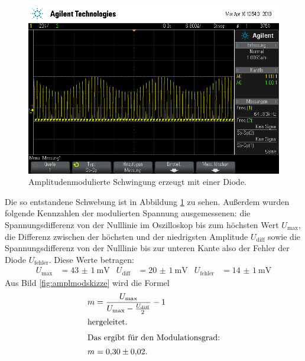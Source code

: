 \begin{figure}[h]
  \centering
  \includegraphics[width=.9\textwidth]{Oszi_Pics/amplModDiode.png}
  \caption{Amplitudenmodulierte Schwingung erzeugt mit einer Diode.}
  \label{fig:amplModDiode}
\end{figure}

Die so entstandene Schwebung ist in Abbildung \ref{fig:amplModDiode} zu sehen.
Außerdem wurden folgende Kennzahlen der modulierten Spannung ausgemessenen:
die Spannungsdifferenz von der Nulllinie im Oszilloskop bis zum höchsten Wert $U_\text{max}$, die Differenz zwischen der höchsten und der niedrigsten Amplitude $U_\text{diff}$ sowie die Spannungsdifferenz von der Nulllinie bis zur unteren Kante also der Fehler der Diode $U_\text{fehler}$.
Diese Werte betragen:
\begin{align*}
  U_\text{max} &= \SI{43(1)}{\milli\volt} & U_\text{diff} &= \SI{20(1)}{\milli\volt}  & U_\text{fehler} &= \SI{14(1)}{\milli\volt}
\end{align*}
Aus Bild \ref{fig:amplmodskizze} wird die Formel
\begin{align}
  m &= \frac{U_\text{max}}{U_\text{max} - \frac{U_\text{diff}}{2}} - 1\\
  \intertext{hergeleitet.}
  \intertext{Das ergibt für den Modulationsgrad:}
  m &= \num{0.30(2)}.
\end{align}

